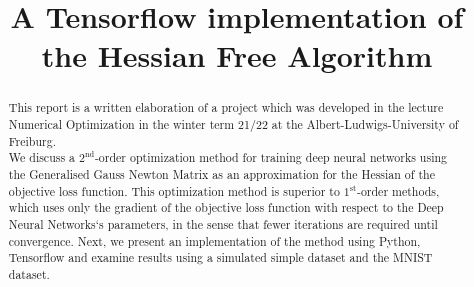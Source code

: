 \documentclass[conference]{IEEEtran}
\begin{document}
\title{A Tensorflow implementation of the Hessian Free Algorithm
}

\author{
\and
{}
\and
{}
}

\maketitle

\begin{abstract}
This report is a written elaboration of a project which was developed in the lecture Numerical Optimization in the winter term 21/22 at the Albert-Ludwigs-University of Freiburg.\\
We discuss a $2^{\text{nd}}$-order optimization method for training deep neural networks using the Generalised Gauss Newton Matrix as an approximation for the Hessian of the objective loss function. This optimization method is superior to $1^{\text{st}}$-order methods, which uses only the gradient of the objective loss function with respect to the Deep Neural Networks`s parameters, in the sense that fewer iterations are required until convergence. Next, we present an implementation of the method using Python, Tensorflow and examine results using a simulated simple dataset and the MNIST dataset.
\end{abstract}
\end{document}
